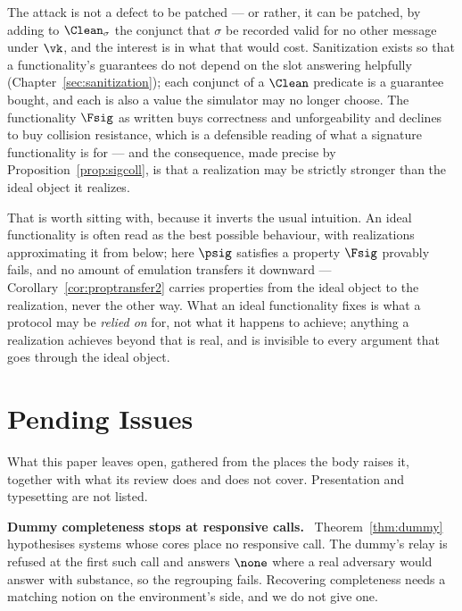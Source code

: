 \documentclass[10pt,oneside,openany]{book}
\makeatletter
\newcommand{\nav@headtext}{}
\newcommand{\chapterheadstar}[1]{\gdef\nav@headtext{#1}}
\newcommand{\heading}[1]{\medskip\par\noindent\textcolor{accent}{\textbf{#1.}}\ }
\theoremstyle{accentdef}
\theoremstyle{accentplain}
\makeatother
\begin{document}
The attack is not a defect to be patched --- or rather, it can be patched, by adding to
$\Clean_{\sigma}$ the conjunct that $\sigma$ be recorded valid for no other message under $\vk$,
and the interest is in what that would cost. Sanitization exists so that a functionality's
guarantees do not depend on the slot answering helpfully (Chapter~\ref{sec:sanitization}); each
conjunct of a $\Clean$ predicate is a guarantee bought, and each is also a value the simulator may
no longer choose. The functionality $\Fsig$ as written buys correctness and unforgeability and declines to buy
collision resistance, which is a defensible reading of what a signature functionality is for --- and
the consequence, made precise by Proposition~\ref{prop:sigcoll}, is that a realization may be
strictly stronger than the ideal object it realizes.

That is worth sitting with, because it inverts the usual intuition. An ideal functionality is
often read as the best possible behaviour, with realizations approximating it from below; here
$\psig$ satisfies a property $\Fsig$ provably fails, and no amount of emulation transfers it
downward --- Corollary~\ref{cor:proptransfer2} carries properties from the ideal object to the
realization, never the other way. What an ideal functionality fixes is what a protocol may be
\emph{relied on} for, not what it happens to achieve; anything a realization achieves beyond that
is real, and is invisible to every argument that goes through the ideal object.


{}
\chapter*{Pending Issues}
\chapterheadstar{Pending Issues}

What this paper leaves open, gathered from the places the body raises it, together with what its
review does and does not cover. Presentation and typesetting are not listed.

\heading{Dummy completeness stops at responsive calls} Theorem~\ref{thm:dummy} hypothesises systems
whose cores place no responsive call. The dummy's relay is refused at the first such call and
answers $\none$ where a real adversary would answer with substance, so the regrouping fails.
Recovering completeness needs a matching notion on the environment's side, and we do not give one.
\end{document}
